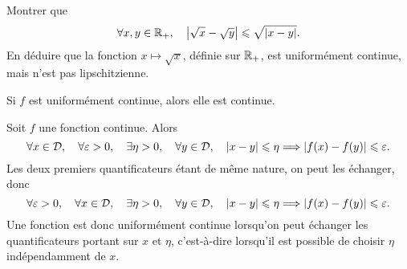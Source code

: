 \documentclass{magnolia}
\begin{document}
\begin{exoUnique}
\exo
  \begin{questions}
\question Montrer que
  \[\forall x,y\in\mathbb{R}_+ ,\quad \left|\sqrt{x}-\sqrt{y}\right|\leqslant\sqrt{\left|x-y\right|}.\]
\question En déduire que la fonction $x\mapsto \sqrt{x}$, définie sur $\mathbb{R}_+$,
   est uniformément continue, mais n'est pas lipschitzienne.
  \end{questions}
\end{exoUnique}

\begin{proposition}[utile=-3]
Si $f$ est uniformément continue, alors elle est continue.
\end{proposition}

\begin{remarqueUnique}
\remarque Soit $f$ une fonction continue. Alors
  \[\forall x\in\mathcal{D} ,\quad \forall \varepsilon>0 ,\quad \exists \eta>0
    ,\quad \forall y\in\mathcal{D} ,\quad \left|x-y\right|\leqslant\eta \Longrightarrow
    \left|f(x)-f(y)\right|\leqslant\varepsilon.\]
  Les deux premiers quantificateurs étant de même nature, on peut les échanger,
  donc
  \[\forall \varepsilon>0 ,\quad \forall x\in\mathcal{D} ,\quad \exists \eta>0
    ,\quad \forall y\in\mathcal{D} ,\quad \left|x-y\right|\leqslant\eta \Longrightarrow
    \left|f(x)-f(y)\right|\leqslant\varepsilon.\]
  Une fonction est donc uniformément continue lorsqu'on peut échanger les
  quantificateurs portant sur $x$ et $\eta$, c'est-à-dire lorsqu'il est
  possible de choisir $\eta$ indépendamment de $x$.
\end{remarqueUnique}
\end{document}
